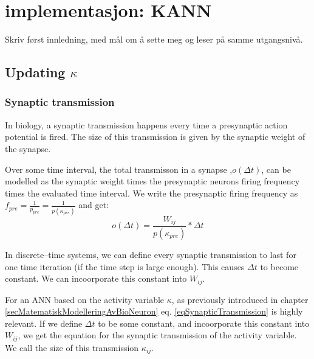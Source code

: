 %

\chapter{implementasjon: KANN}
	Skriv først innledning, med mål om å sette meg og leser på samme utgangsnivå.

	
	\section{Updating $\kappa$} %
		\subsection{Synaptic transmission}
			In biology, a synaptic transmission happens every time a presynaptic action potential is fired.
			The size of this transmission is given by the synaptic weight of the synapse.

			Over some time interval, the total transmisson in a synapse ,$o(\Delta t)$, can be modelled as the synaptic weight times the presynaptic neurons firing frequency times the evaluated time interval.
			We write the presynaptic firing frequency as $f_{pre} = \frac{1}{p_{pre}} = \frac{1}{p(\kappa_{pre})}$ and get:
			\begin{equation}
				\label{eqSynapticTransmission}
				o(\Delta t) = \frac{ W_{ij} }{ p(\kappa_{pre})} * \Delta t 
			\end{equation}

			In discrete--time systems, we can define every synaptic transmission to last for one time iteration (if the time step is large enough).  %
			This causes $\Delta t$ to become constant. We can incoorporate this constant into $W_{ij}$.

			For an ANN based on the activity variable $\kappa$, as previously introduced in chapter \ref{secMatematiskModelleringAvBioNeuron} %
			eq. \eqref{eqSynapticTransmission} is highly relevant.  %
			If we define $\Delta t$ to be some constant, and incoorporate this constant into $W_{ij}$, we get the equation for the synaptic transmission of the activity variable.
			We call the size of this transmission $\kappa_{ij}$.

